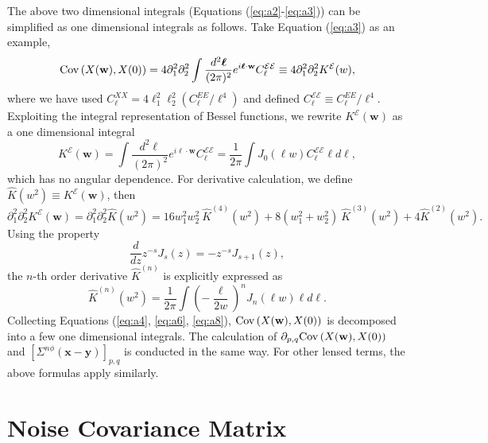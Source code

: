 \documentclass[iop,apj, numberedappendix]{emulateapj}
\def\be{\begin{equation}}
\def\ee{\end{equation}}
\def\mE{\mathcal E}
\newcommand*\Bell{\ensuremath{\boldsymbol\ell}}
\begin{document}
The above two dimensional integrals (Equations (\ref{eq:a2}-\ref{eq:a3})) can be simplified as  one dimensional integrals
as follows. Take Equation (\ref{eq:a3}) as an example,
\be
\label{eq:a4}
{\rm Cov}\left( X(\mathbf w), X(0) \right)
= 4\partial_1^2\partial_2^2 \int \frac{d^2\Bell}{(2\pi)^2} e^{i\Bell\cdot \mathbf w} C_\ell^{\mE\mE}
\equiv 4\partial_1^2\partial_2^2 K^{\mathcal E}(w),
\ee
where we have used $C_\ell^{XX} = 4\ell_1^2 \ell_2^2 (C_\ell^{EE}/\ell^4)$
and defined $C_\ell^{\mE\mE} \equiv C_\ell^{EE}/\ell^4 $.
Exploiting the integral representation of Bessel functions, we rewrite $K^{\mathcal E}(\mathbf w)$ as a one dimensional
integral
\be
K^{\mathcal E}(\mathbf w)
=\int \frac{d^2\Bell}{(2\pi)^2} e^{i\Bell\cdot \mathbf w} C_\ell^{\mE\mE}
=\frac{1}{2\pi}\int  J_0\left(\ell w \right)  C_\ell^{\mE\mE} \ell d\ell,
\ee
which has no angular dependence.
For derivative calculation, we define $\hat K(w^2) \equiv K^{\mathcal E}(\mathbf w)$,
then
\be
\label{eq:a6}
\partial_1^2 \partial_2^2 K^{\mathcal E}(\mathbf w)
=\partial_1^2 \partial_2^2 \hat K (w^2)
= 16w_1^2w_2^2 \ \hat K^{(4)}(w^2)  + 8(w_1^2 + w_2^2) \ \hat K^{(3)}(w^2)  + 4\hat K^{(2)}(w^2).
\ee
Using the property
\be
\frac{d}{dz} z^{-s} J_s(z) = - z^{-s} J_{s+1}(z),
\ee
the $n$-th order derivative $\hat K^{(n)}$ is explicitly expressed as
\be
\label{eq:a8}
\hat K^{(n)}(w^2)
= \frac{1}{2\pi} \int \left(-\frac{\ell}{2w} \right)^n  J_n(\ell w) \ell d\ell.
\ee
Collecting Equations (\ref{eq:a4}, \ref{eq:a6}, \ref{eq:a8}),  ${\rm Cov}\left( X(\mathbf w), X(0) \right)$
is decomposed into a few one dimensional integrals.
The calculation of $\partial_{p,q}{\rm Cov}\left( X(\mathbf w), X(0) \right)$ and
$\left[\Sigma^{n\phi}(\mathbf x-\mathbf y)\right]_{p,q}$ is conducted in the same way.
For other lensed terms, the above formulas apply similarly.

\section{Noise Covariance Matrix}
\label{sec:app2}
\end{document}
